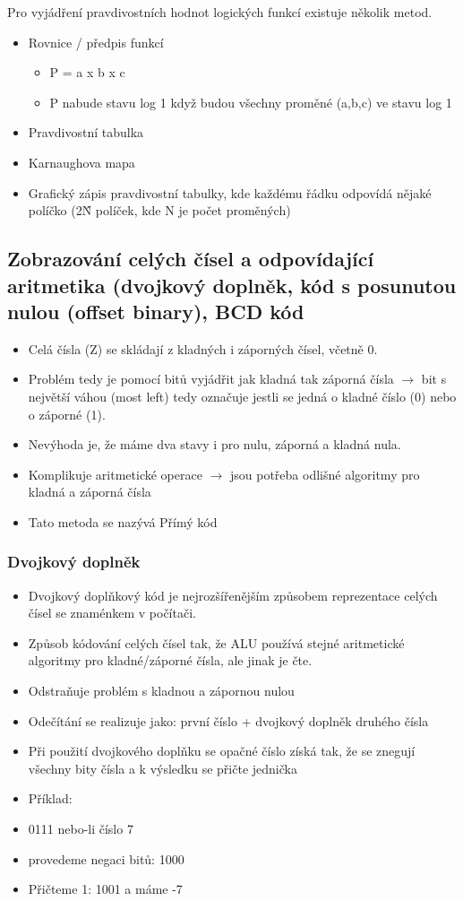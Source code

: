 \documentclass[10pt,a4paper]{article}
\begin{document}
Pro vyjádření pravdivostních hodnot logických funkcí existuje několik metod.


\begin{itemize}
\item Rovnice / předpis funkcí
\begin{itemize}
\item P = a x b x c
\item P nabude stavu log 1 když budou všechny proměné (a,b,c) ve stavu log 1
\end{itemize}
\item Pravdivostní tabulka
\item Karnaughova mapa
\item Grafický zápis pravdivostní tabulky, kde každému řádku odpovídá nějaké políčko (2\^N políček, kde N je počet proměných)
\end{itemize}


\subsection{Zobrazování celých čísel a odpovídající aritmetika (dvojkový doplněk, kód s posunutou nulou (offset binary), BCD kód}
\begin{itemize}
\item Celá čísla (Z) se skládají z kladných i záporných čísel, včetně 0.
\item Problém tedy je pomocí bitů vyjádřit jak kladná tak záporná čísla $\rightarrow$ bit s největší váhou (most left) tedy označuje jestli se jedná o kladné číslo (0) nebo o záporné (1).
\item Nevýhoda je, že máme dva stavy i pro nulu, záporná a kladná nula.
\item Komplikuje aritmetické operace $\rightarrow$ jsou potřeba odlišné algoritmy pro kladná a záporná čísla
\item Tato metoda se nazývá Přímý kód
\end{itemize}

\subsubsection{Dvojkový doplněk}
\begin{itemize}
\item Dvojkový doplňkový kód je nejrozšířenějším způsobem reprezentace celých čísel se znaménkem v počítači.
\item Způsob kódování celých čísel tak, že ALU používá stejné aritmetické algoritmy pro kladné/záporné čísla, ale jinak je čte.
\item Odstraňuje problém s kladnou a zápornou nulou
\item Odečítání se realizuje jako: první číslo + dvojkový doplněk druhého čísla
\item Při použití dvojkového doplňku se opačné číslo získá tak, že se znegují všechny bity čísla a k výsledku se přičte jednička
\item Příklad:
\item 0111 nebo-li číslo 7
\item provedeme negaci bitů: 1000
\item Přičteme 1: 1001 a máme -7
\end{itemize}
\end{document}
